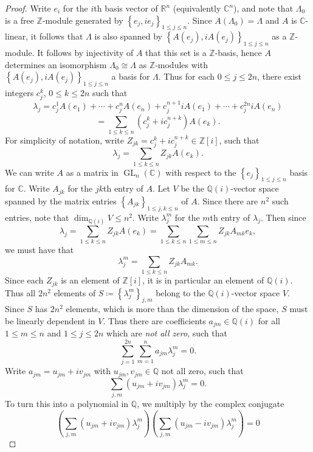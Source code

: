 \documentclass[11pt, letterpaper]{article}
\theoremstyle{plain}
\begin{document}
\begin{proof}
	Write $e_i$ for the $i$th basis vector of $\mathbb{R} ^n$ (equivalently $\mathbb{C}^n$), and note that $\Lambda _0$ is a free $\mathbb{Z} $-module generated by $\left\{ e_j,ie_j \right\}_{1\leq j\leq n} $. Since $A(\Lambda _0)=\Lambda $ and $A$ is $\mathbb{C} $-linear, it follows that $\Lambda $ is also spanned by $\left\{ A(e_j) ,iA(e_j) \right\}_{1\leq j\leq n} $ as a $\mathbb{Z} $-module. It follows by injectivity of $A$ that this set is a $\mathbb{Z} $-basis, hence $A$ determines an isomorphism $\Lambda _0 \cong \Lambda $ as $\mathbb{Z} $-modules with $\left\{ A(e_j),iA(e_j) \right\} _{1\leq j\leq n} $ a basis for $\Lambda $. Thus for each $0\leq j\leq 2n$, there exist integers $c_j^k$, $0\leq k\leq 2n$ such that
	\[
		\lambda_j = c_j^1 A(e_1) + \cdots + c_j^n A(e_n) + c_j^{n+1} iA(e_1) + \cdots + c_j^{2n} iA(e_n)
	\]
	\[
		=\sum_{1\leq k\leq n} \left( c_j^k + ic_j^{n+k}  \right) A(e_k)
	.\]
	For simplicity of notation, write $Z_{jk} =c_j^k+ic_j^{n+k} \in\mathbb{Z} [i]$, such that
	\[
		\lambda _j = \sum_{1\leq k\leq n} Z_{jk} A(e_k)
	.\]
	We can write $A$ as a matrix in $\operatorname{GL} _n(\mathbb{C} )$ with respect to the $\left\{ e_j \right\}_{1\leq j\leq n} $ basis for $\mathbb{C} $. Write $A_{jk}$ for the $jk$th entry of $A$. Let $V$ be the $\mathbb{Q} (i)$-vector space spanned by the matrix entries $\left\{ A_{jk}  \right\} _{1\leq j,k\leq n} $ of $A$. Since there are $n^2$ such entries, note that $\dim _{\mathbb{Q} (i)} V \leq n^2$. Write $\lambda_j^m$ for the $m$th entry of $\lambda _j$. Then since
	\[
		\lambda _j = \sum_{1\leq k\leq n} Z_{jk} A(e_k) = \sum_{1\leq k\leq n} \sum_{1\leq m\leq n} Z_{jk} A_{mk}e_k ,
	\]
	we must have that
	\[
		\lambda_j^m = \sum_{1\leq k\leq n} Z_{jk} A_{mk} 
	.\]
	Since each $Z_{jk}$ is an element of $\mathbb{Z} [i]$, it is in particular an element of $\mathbb{Q} (i)$. Thus all $2n^2$ elements of $S\coloneqq \left\{ \lambda _j^m \right\}_{j,m} $ belong to the $\mathbb{Q} (i)$-vector space $V$. Since $S$ has $2n^2$ elements, which is more than the dimension of the space, $S$ must be linearly dependent in $V$. Thus there are coefficients $a_{jm} \in\mathbb{Q} (i)$ for all $1\leq m\leq n$ and $1\leq j\leq 2n$ which are \emph{not all zero}, such that
	\[
		\sum_{j=1}^{2n} \sum_{m=1}^{n} a_{jm} \lambda _{j}^m =0
	.\]
	Write $a_{jm} = u_{jm} +iv_{jm} $ with $u_{jm} ,v_{jm} \in\mathbb{Q} $ not all zero, such that
	\[
		\sum_{j,m} \left( u_{jm} +iv_{jm}  \right) \lambda_j^m=0
	.\]
	To turn this into a polynomial in $\mathbb{Q} $, we multiply by the complex conjugate
	\[
		\left( \sum_{j,m} \left( u_{jm} +iv_{jm}  \right) \lambda _j^m \right) \left( \sum_{j,m} \left( u_{jm} -iv_{jm}  \right) \lambda_j^m \right) =0
\]
\end{proof}
\end{document}
